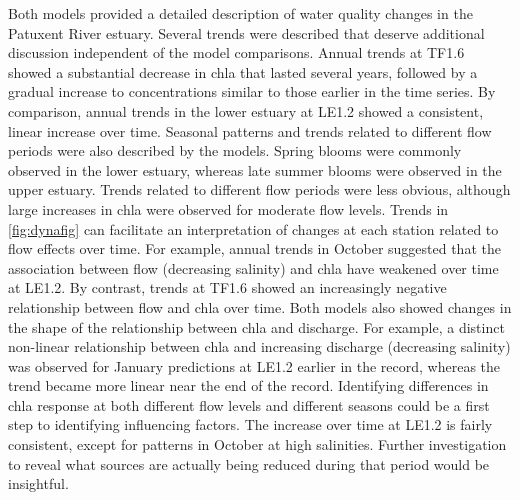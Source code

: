\documentclass[letterpaper,12pt,oneside]{article}\usepackage[]{graphicx}\usepackage[]{color}
\begin{document}
Both models provided a detailed description of water quality changes in the Patuxent River estuary.  Several trends were described that deserve additional discussion independent of the model comparisons.  Annual trends at TF1.6 showed a substantial decrease in \ac{chla} that lasted several years, followed by a gradual increase to concentrations similar to those earlier in the time series.  By comparison, annual trends in the lower estuary at LE1.2 showed a consistent, linear increase over time.  Seasonal patterns and trends related to different flow periods were also described by the models.  Spring blooms were commonly observed in the lower estuary, whereas late summer blooms were observed in the upper estuary.  Trends related to different flow periods were less obvious, although large increases in \ac{chla} were observed for moderate flow levels.  Trends in \cref{fig:dynafig} can facilitate an interpretation of changes at each station related to flow effects over time.  For example, annual trends in October suggested that the association between flow (decreasing salinity) and \ac{chla} have weakened over time at LE1.2.  By contrast, trends at TF1.6 showed an increasingly negative relationship between flow and \ac{chla} over time.  Both models also showed changes in the shape of the relationship between \ac{chla} and discharge.  For example, a distinct non-linear relationship between \ac{chla} and increasing discharge (decreasing salinity) was observed for January predictions at LE1.2 earlier in the record, whereas the trend became more linear near the end of the record. Identifying differences in \ac{chla} response at both different flow levels and different seasons could be a first step to identifying influencing factors. The increase over time at LE1.2 is fairly consistent, except for patterns in October at high salinities. Further investigation to reveal what sources are actually being reduced during that period would be insightful. 
\end{document}
